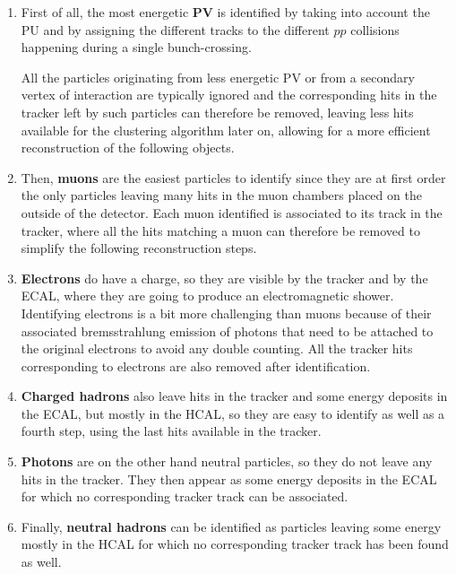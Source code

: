 \documentclass[a4paper, 10pt, openright]{report}
\begin{document}
\begin{enumerate}
\item First of all, the most energetic \textbf{\acf{PV}} is identified by taking into account the \ac{PU} and by assigning the different tracks to the different $pp$ collisions happening during a single bunch-crossing. 

All the particles originating from less energetic \ac{PV} or from a secondary vertex of interaction are typically ignored and the corresponding hits in the tracker left by such particles can therefore be removed, leaving less hits available for the clustering algorithm later on, allowing for a more efficient reconstruction of the following objects.
\item Then, \textbf{muons} are the easiest particles to identify since they are at first order the only particles leaving many hits in the muon chambers placed on the outside of the detector. Each muon identified is associated to its track in the tracker, where all the hits matching a muon can therefore be removed to simplify the following reconstruction steps.
\item \textbf{Electrons} do have a charge, so they are visible by the tracker and by the \ac{ECAL}, where they are going to produce an electromagnetic shower. Identifying electrons is a bit more challenging than muons because of their associated bremsstrahlung emission of photons that need to be attached to the original electrons to avoid any double counting. All the tracker hits corresponding to electrons are also removed after identification.
\item \textbf{Charged hadrons} also leave hits in the tracker and some energy deposits in the \ac{ECAL}, but mostly in the \ac{HCAL}, so they are easy to identify as well as a fourth step, using the last hits available in the tracker.
\item \textbf{Photons} are on the other hand neutral particles, so they do not leave any hits in the tracker. They then appear as some energy deposits in the \ac{ECAL} for which no corresponding tracker track can be associated.
\item Finally, \textbf{neutral hadrons} can be identified as particles leaving some energy mostly in the \ac{HCAL} for which no corresponding tracker track has been found as well.
\end{enumerate}
\end{document}
